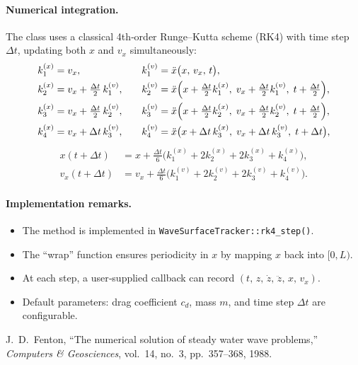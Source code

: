 \documentclass{article}
\begin{document}
\paragraph{Numerical integration.}  
The class uses a classical 4th‐order Runge–Kutta scheme (RK4) with time step \(\Delta t\), updating both \(x\) and \(v_x\) simultaneously:
\[
\begin{aligned}
  k_{1}^{(x)} &= v_x, 
  &\quad
  k_{1}^{(v)} &= \ddot x\bigl(x,\,v_x,\,t\bigr),\\
  k_{2}^{(x)} &= v_x + \tfrac{\Delta t}{2}\,k_{1}^{(v)}, 
  &\quad
  k_{2}^{(v)} &= \ddot x\Bigl(x + \tfrac{\Delta t}{2}k_{1}^{(x)},\;v_x + \tfrac{\Delta t}{2}k_{1}^{(v)},\;t+\tfrac{\Delta t}{2}\Bigr),\\
  k_{3}^{(x)} &= v_x + \tfrac{\Delta t}{2}\,k_{2}^{(v)}, 
  &\quad
  k_{3}^{(v)} &= \ddot x\Bigl(x + \tfrac{\Delta t}{2}k_{2}^{(x)},\;v_x + \tfrac{\Delta t}{2}k_{2}^{(v)},\;t+\tfrac{\Delta t}{2}\Bigr),\\
  k_{4}^{(x)} &= v_x + \Delta t\,k_{3}^{(v)}, 
  &\quad
  k_{4}^{(v)} &= \ddot x\bigl(x + \Delta t\,k_{3}^{(x)},\;v_x + \Delta t\,k_{3}^{(v)},\;t+\Delta t\bigr),
\end{aligned}
\]
\[
\begin{aligned}
  x(t+\Delta t) &= x + \tfrac{\Delta t}{6}\bigl(k_{1}^{(x)} + 2k_{2}^{(x)} + 2k_{3}^{(x)} + k_{4}^{(x)}\bigr),\\
  v_x(t+\Delta t) &= v_x + \tfrac{\Delta t}{6}\bigl(k_{1}^{(v)} + 2k_{2}^{(v)} + 2k_{3}^{(v)} + k_{4}^{(v)}\bigr).
\end{aligned}
\]

\paragraph{Implementation remarks.}
\begin{itemize}
  \item The method is implemented in \texttt{WaveSurfaceTracker::rk4\_step()}.
  \item The “wrap” function ensures periodicity in \(x\) by mapping \(x\) back into \([0,L)\).
  \item At each step, a user‐supplied callback can record \((t,\,z,\,\dot z,\,\ddot z,\,x,\,v_x)\).
  \item Default parameters: drag coefficient \(c_d\), mass \(m\), and time step \(\Delta t\) are configurable.
\end{itemize}

\begin{thebibliography}{1}
J.~D.~Fenton, “The numerical solution of steady water wave problems,” \emph{Computers \& Geosciences}, vol.~14, no.~3, pp.~357–368, 1988.
\end{thebibliography}
\end{document}
